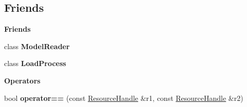 \subsection*{Friends}
\begin{Indent}\textbf{ Friends}\par
\begin{DoxyCompactItemize}
\item 
\mbox{\label{classrev_1_1_resource_handle_ac3e0a085a76d6fcad904e95ebbe2c6a5}} 
class {\bfseries Model\+Reader}
\item 
\mbox{\label{classrev_1_1_resource_handle_af08a66cdff89abe314f17f213ef57b66}} 
class {\bfseries Load\+Process}
\end{DoxyCompactItemize}
\end{Indent}
\begin{Indent}\textbf{ Operators}\par
\begin{DoxyCompactItemize}
\item 
\mbox{\label{classrev_1_1_resource_handle_a97e7e5d87fbefb3aa8c53c2a3e29e083}} 
bool {\bfseries operator==} (const \mbox{\hyperlink{classrev_1_1_resource_handle}{Resource\+Handle}} \&r1, const \mbox{\hyperlink{classrev_1_1_resource_handle}{Resource\+Handle}} \&r2)
\end{DoxyCompactItemize}
\end{Indent}

